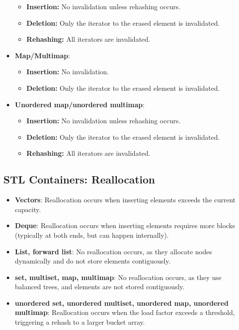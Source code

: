 \documentclass{report}
\begin{document}
\begin{itemize}
            \begin{itemize}
                \item \textbf{Insertion:} No invalidation unless rehashing occurs.
                \item \textbf{Deletion:} Only the iterator to the erased element is invalidated.
                \item \textbf{Rehashing:} All iterators are invalidated.
            \end{itemize}
        \item \textbf{Map/Multimap}:
            \begin{itemize}
                \item \textbf{Insertion:} No invalidation.
                \item \textbf{Deletion:} Only the iterator to the erased element is invalidated.
            \end{itemize}
        \item \textbf{Unordered map/unordered multimap}:
            \begin{itemize}
                \item \textbf{Insertion:} No invalidation unless rehashing occurs.
                \item \textbf{Deletion:} Only the iterator to the erased element is invalidated.
                \item \textbf{Rehashing:} All iterators are invalidated.
            \end{itemize}
   \end{itemize}

   \pagebreak 
   \subsection{STL Containers: Reallocation}
   \begin{itemize}
       \item \textbf{Vectors}: Reallocation occurs when inserting elements exceeds the current capacity.
       \item \textbf{Deque}: Reallocation occurs when inserting elements requires more blocks (typically at both ends, but can happen internally).
        \item \textbf{List, forward list}: No reallocation occurs, as they allocate nodes dynamically and do not store elements contiguously.
        \item \textbf{set, multiset, map, multimap}: No reallocation occurs, as they use balanced trees, and elements are not stored contiguously.
        \item \textbf{unordered set, unordered multiset, unordered map, unordered multimap}:  Reallocation occurs when the load factor exceeds a threshold, triggering a rehash to a larger bucket array.
   \end{itemize}
\end{document}
